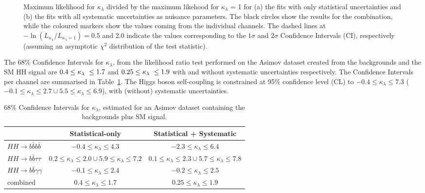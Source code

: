 \begin{figure}[!htb]
\centering 
{} 
\caption{Maximum likelihood for $\kappa_{\lambda}$ divided by the maximum likehood for $\kappa_{\lambda}$ = 1 for (a) the fits with only statistical uncertainties and (b) the fits with all systematic uncertainties as nuisance parameters. The black circles show the results for the combination, while the coloured markers show the values coming from the individual channels. The dashed lines at $-\ln\left(L_{\kappa_{\lambda}}/L_{\kappa_{\lambda}=1}\right) = 0.5$ and 2.0 indicate the values corresponding to the $1\sigma$ and $2\sigma$ Confidence Intervals (CI), respectively (assuming an asymptotic $\chi^2$ distribution of the test statistic).} 
\label{fig:ATLAS_HH_comb} 
\end{figure}

The 68\% Confidence Intervals for $\kappa_{\lambda}$, from the likelihood ratio test performed on the Asimov dataset created from the backgrounds and the SM HH signal are $0.4 \leq \kappa_{\lambda}\ \leq 1.7$ and $0.25 \leq \kappa_{\lambda}\ \leq 1.9$ with and without systematic uncertainties respectively. The Confidence Intervals per channel are summarised in Table~\ref{tab:ATLAS_HH_kappalambda}. 
The Higgs boson self-coupling is constrained at 95\% confidence level (CL) to $-0.4\leq \kappa_{\lambda} \leq7.3$ ($-0.1\leq \kappa_{\lambda} \leq2.7\cup5.5\leq \kappa_{\lambda} \leq6.9$), with (without) systematic uncertainties.


\begin{table}[htb!]
\begin{center}
\begin{tabular}{lcc} \toprule
 & \textbf{Statistical-only} & \textbf{Statistical + Systematic}\\
\hline
$HH \rightarrow b\bar{b}b\bar{b}$ & $-0.4 \leq \kappa_{\lambda} \leq 4.3$ & $-2.3 \leq \kappa_{\lambda} \leq 6.4$ \\
$HH \rightarrow b\bar{b}\tau\tau$ &  $0.2 \leq \kappa_{\lambda} \leq 2.0 \cup 5.9 \leq \kappa_{\lambda} \leq 7.2$ & $0.1 \leq \kappa_{\lambda} \leq 2.3 \cup 5.7 \leq \kappa_{\lambda} \leq 7.8$ \\
$HH \rightarrow b\bar{b}\gamma\gamma$ &  $-0.1 \leq \kappa_{\lambda} \leq 2.4$ & $-0.2 \leq \kappa_{\lambda} \leq 2.5$ \\
combined &   $0.4 \leq \kappa_{\lambda} \leq 1.7$ & $0.25 \leq \kappa_{\lambda} \leq 1.9$ \\
\bottomrule
\end{tabular}
\end{center}
\caption{68\% Confidence Intervals for $\kappa_{\lambda}$, estimated for an Asimov dataset containing the backgrounds plus SM signal.}
\label{tab:ATLAS_HH_kappalambda}
\end{table}



